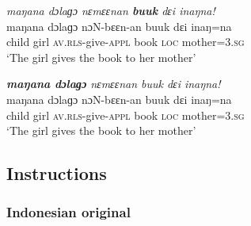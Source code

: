 \z
\z



\ea
\label{appendix-Focus Question 8}

\newpage
{
	
	\ex
	\textit{maŋana dɔlaɡɔ nɛmɛɛnan \textbf{buuk} dɛi inaŋna!} \\
	\gll   maŋana dɔlaɡɔ nɔN-bɛɛn-an buuk dɛi inaŋ=na\\
	child girl \textsc{av.rls-}give-\textsc{appl} book \textsc{loc} mother\textsc{=3.sg}\\
	\glt `The girl gives the book to her mother' 
}


\z
\z



\ea
\label{appendix-Focus Question 9}

{
	
	\ex
	\textit{\textbf{maŋana dɔlaɡɔ} nɛmɛɛnan buuk dɛi inaŋna!} \\
	\gll   maŋana dɔlaɡɔ nɔN-bɛɛn-an buuk dɛi inaŋ=na\\
	child girl \textsc{av.rls-}give\textsc{-appl} book \textsc{loc} mother\textsc{=3.sg}\\
	\glt `The girl gives the book to her mother' 
}


\z
\z








\subsection{Instructions}



\subsubsection{Indonesian original}

